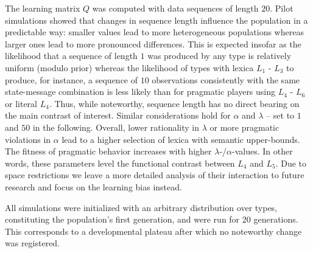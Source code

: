 \documentclass[10pt,a4paper]{article}
\begin{document}
The learning matrix $Q$ was computed with data sequences of length $20$. Pilot simulations showed that changes in sequence length influence the population in a predictable way: smaller values lead to more heterogeneous populations whereas larger ones lead to more pronounced differences. This is expected insofar as the likelihood that a sequence of length $1$ was produced by any type is relatively uniform (modulo prior) whereas the likelihood of types with lexica $L_1$ - $L_3$ to produce, for instance, a sequence of $10$ observations consistently with the same state-message combination is less likely than for pragmatic players using $L_4$ - $L_6$ or literal $L_4$. Thus, while noteworthy, sequence length has no direct bearing on the main contrast of interest. Similar considerations hold for $\alpha$ and $\lambda$ -- set to $1$ and $50$ in the following. Overall, lower rationality in $\lambda$ or more pragmatic violations in $\alpha$ lead to a higher selection of lexica with semantic upper-bounds. The fitness of pragmatic behavior increases with higher $\lambda$-/$\alpha$-values. In other words, these parameters level the functional contrast between $L_4$ and $L_5$. Due to space restrictions we leave a more detailed analysis of their interaction to future research and focus on the learning bias instead.
 
All simulations were initialized with an arbitrary distribution over types, constituting the population's first generation, and were run for $20$ generations. This corresponds to a developmental plateau after which no noteworthy change was registered. 

\vspace{-0.2cm}
\end{document}
